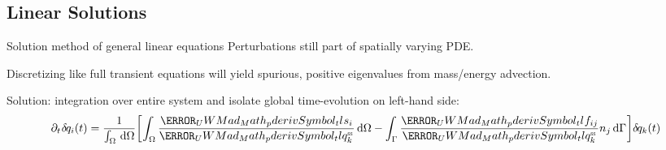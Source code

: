 \documentclass[10pt,t,xcolor=table,compress]{UWMadBeamer}
\begin{document}
    \subsection*{Linear Solutions}
    \begin{frame}{Solution method of general linear equations}
        Perturbations still part of spatially varying PDE.
        
        Discretizing like full transient equations will yield spurious, positive eigenvalues from mass/energy advection.
        
        Solution: integration over entire system and isolate global time-evolution on left-hand side:
        \begin{equation}
            \pdt\dq_i(t) = 
                \frac{1}{\int_\Omega \dV} \left[\int_\Omega\pderiv{s_i}{\qSS_k{}}\dV - 
                \int_\S\pderiv{f_{ij}}{\qSS_k{}}n_j\dS\right] \dq_k(t)
        \end{equation}
        
    \end{frame}
\end{document}
